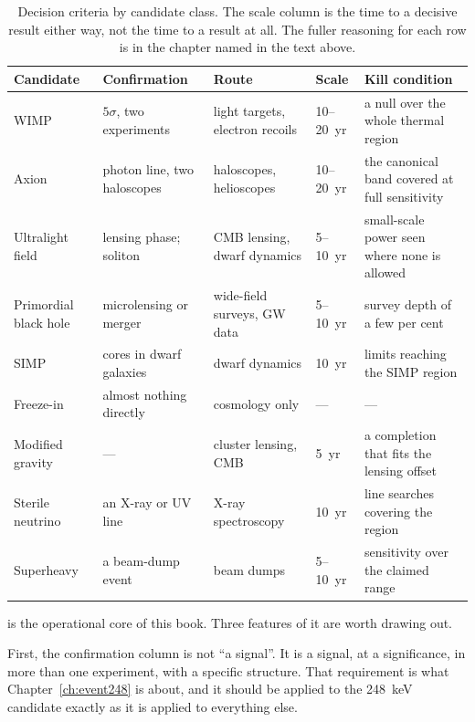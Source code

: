 \begin{table}[!htbp]
\centering
\caption{Decision criteria by candidate class. The scale column is the time to
a decisive result either way, not the time to a result at all. The fuller
reasoning for each row is in the chapter named in the text above.}
\label{tab:criteria}
\setlength{\tabcolsep}{4pt}
\footnotesize
\begin{tabular}{@{}>{\RaggedRight\arraybackslash}p{}p{}p{}p{}p{}@{}}
\toprule
\textbf{Candidate} & \textbf{Confirmation} & \textbf{Route} & \textbf{Scale} & \textbf{Kill condition} \\
\midrule
WIMP & $5\sigma$, two experiments & light targets, electron recoils & 10--20~yr & a null over the whole thermal region \\
Axion & photon line, two haloscopes & haloscopes, helioscopes & 10--20~yr & the canonical band covered at full sensitivity \\
Ultralight field & lensing phase; soliton & CMB lensing, dwarf dynamics & 5--10~yr & small-scale power seen where none is allowed \\
Primordial black hole & microlensing or merger & wide-field surveys, GW data & 5--10~yr & survey depth of a few per cent \\
SIMP & cores in dwarf galaxies & dwarf dynamics & 10~yr & limits reaching the SIMP region \\
Freeze-in & almost nothing directly & cosmology only & --- & --- \\
Modified gravity & --- & cluster lensing, CMB & 5~yr & a completion that fits the lensing offset \\
Sterile neutrino & an X-ray or UV line & X-ray spectroscopy & 10~yr & line searches covering the region \\
Superheavy & a beam-dump event & beam dumps & 5--10~yr & sensitivity over the claimed range \\
\bottomrule
\end{tabular}
\end{table}

 is the operational core of this book. Three features
of it are worth drawing out.

First, the confirmation column is not ``a signal''. It is a signal, at a
significance, in more than one experiment, with a specific structure. That
requirement is what Chapter~\ref{ch:event248} is about, and it should be
applied to the 248~keV candidate exactly as it is applied to everything
else.

